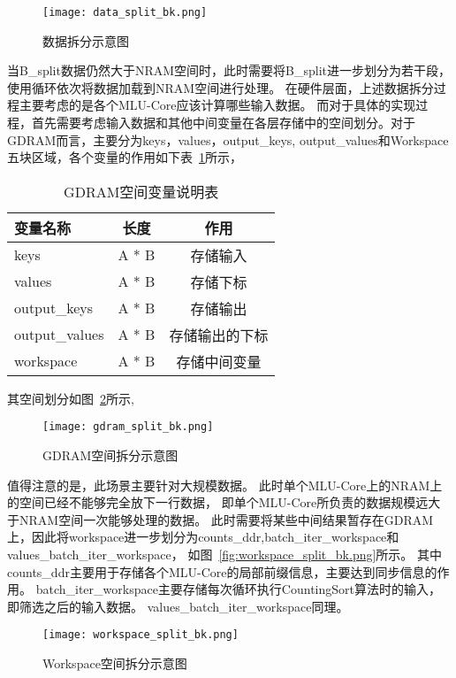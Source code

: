 \begin{figure}[ht]
    \centering
    \texttt{[image: data\_split\_bk.png]}
    \caption{数据拆分示意图}
    \label{fig:data_split_bk}
\end{figure}
当B\_split数据仍然大于NRAM空间时，此时需要将B\_split进一步划分为若干段，
使用循环依次将数据加载到NRAM空间进行处理。
在硬件层面，上述数据拆分过程主要考虑的是各个MLU-Core应该计算哪些输入数据。
而对于具体的实现过程，首先需要考虑输入数据和其他中间变量在各层存储中的空间划分。对于GDRAM而言，主要分为keys，values，output\_keys,
output\_values和Workspace五块区域，各个变量的作用如下表~\ref{tab:gdram_var_bk}所示，
\begin{table}
    \caption{GDRAM空间变量说明表}
    \centering
    \begin{tabular}{lcc}
    \toprule
    变量名称 & 长度 & 作用 \\
    \midrule
    keys & A * B & 存储输入 \\
    values & A * B & 存储下标 \\
    output\_keys & A * B & 存储输出 \\
    output\_values & A * B & 存储输出的下标 \\
    workspace & A * B & 存储中间变量 \\
    \bottomrule
    \end{tabular}
    \label{tab:gdram_var_bk}
\end{table}
其空间划分如图~\ref{fig:gdram_split_bk}所示,
\begin{figure}[ht]
    \centering
    \texttt{[image: gdram\_split\_bk.png]}
    \caption{GDRAM空间拆分示意图}
    \label{fig:gdram_split_bk}
\end{figure}
值得注意的是，此场景主要针对大规模数据。
此时单个MLU-Core上的NRAM上的空间已经不能够完全放下一行数据，
即单个MLU-Core所负责的数据规模远大于NRAM空间一次能够处理的数据。
此时需要将某些中间结果暂存在GDRAM上，因此将workspace进一步划分为counts\_ddr,batch\_iter\_workspace和values\_batch\_iter\_workspace，
如图~\ref{fig:workspace_split_bk.png}所示。
其中counts\_ddr主要用于存储各个MLU-Core的局部前缀信息，主要达到同步信息的作用。
batch\_iter\_workspace主要存储每次循环执行CountingSort算法时的输入，即筛选之后的输入数据。
values\_batch\_iter\_workspace同理。
\begin{figure}[ht]
    \centering
    \texttt{[image: workspace\_split\_bk.png]}
    \caption{Workspace空间拆分示意图}
    \label{fig:workspace_split_bk}
\end{figure}


